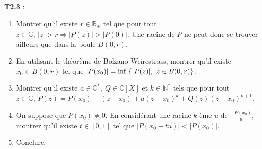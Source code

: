 \documentclass[5pt,a4paper]{article}
\begin{document}
\begin{onehalfspacing}
\textbf{T2.3} : 
\begin{enumerate}
	\item Montrer qu'il existe $r \in \mathbb{R}_+$ tel que pour tout $z \in \mathbb{C},~|z| > r \Longrightarrow |P(z)| > |P(0)|$. Une racine de $P$ ne peut donc se trouver ailleurs que dans la boule $B(0, r)$.
	\item En utilisant le théorème de Bolzano-Weirestrass, montrer qu'il existe $x_0 \in B(0, r)$ tel que $|P(x_0)| = \textup{inf}~\{|P(z)|,~z \in B(0, r)\}$.
	\item Montrer qu'il existe $a \in \mathbb{C}^*,~Q \in \mathbb{C}[X]$ et $k \in \mathbb{N}^*$ tels que pour tout $z \in \mathbb{C},~P(z) = P(x_0) + (z - x_0) + a(z - x_0)^k + Q(z)(z - x_0)^{k+1}$.
	\item On suppose que $P(x_0) \neq 0$. En considérant une racine $k$-ème $u$ de $\frac{-P(x_0)}{a}$, montrer qu'il existe $t \in [0, 1]$ tel que $|P(x_0 + tu)| < |P(x_0)|$.
	\item Conclure.
\end{enumerate}


\end{onehalfspacing}
\end{document}
